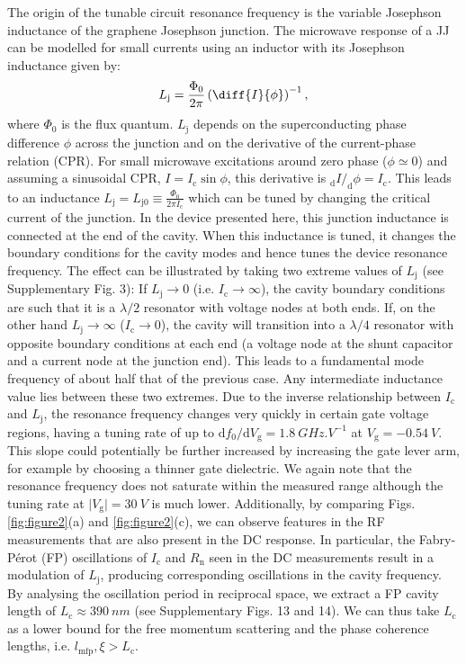 The origin of the tunable circuit resonance frequency is the variable Josephson inductance of the graphene Josephson junction.
The microwave response of a JJ can be modelled for small currents using an inductor with its Josephson inductance given by:
\begin{equation}
L_\text{j} = \frac{\Phi_0}{2\pi} \left(\diff{I}{\phi}\right)^{-1}, \label{eq:Lj}
\end{equation}
where $\Phi_0$ is the flux quantum.
$L_\text{j}$ depends on the superconducting phase difference $\phi$ across the junction and on the derivative of the current-phase relation (CPR).
For small microwave excitations around zero phase ($\phi\simeq 0$) and assuming a sinusoidal CPR, $I=I_\text{c}\sin\phi$, this derivative is $_\text{d}I/_\text{d}\phi = I_\text{c}$.
This leads to an inductance $L_\text{j} = L_{\text{j}0} \equiv \frac{\Phi_0}{2\pi I_\text{c}}$ which can be tuned by changing the critical current of the junction.
In the device presented here, this junction inductance is connected at the end of the cavity.
When this inductance is tuned, it changes the boundary conditions for the cavity modes and hence tunes the device resonance frequency.
The effect can be illustrated by taking two extreme values of $L_\text{j}$ (see Supplementary Fig. 3):
If $L_\text{j}\rightarrow 0$ (i.e. $I_\text{c}\rightarrow\infty$), the cavity boundary conditions are such that it is a $\lambda/2$ resonator with voltage nodes at both ends.
If, on the other hand $L_\text{j}\rightarrow \infty$ ($I_\text{c}\rightarrow 0$), the cavity will transition into a $\lambda/4$ resonator with opposite boundary conditions at each end (a voltage node at the shunt capacitor and a current node at the junction end).
This leads to a fundamental mode frequency of about half that of the previous case.
Any intermediate inductance value lies between these two extremes.
Due to the inverse relationship between $I_\text{c}$ and $L_\text{j}$, the resonance frequency changes very quickly in certain gate voltage regions, having a tuning rate of up to $\mathrm{d}f_0/\mathrm{d}V_\text{g}=\SI{1.8}{GHz.V^{-1}}$ at $V_\text{g}=\SI{-0.54}{V}$.
This slope could potentially be further increased by increasing the gate lever arm, for example by choosing a thinner gate dielectric.
We again note that the resonance frequency does not saturate within the measured range although the tuning rate at $\vert V_\text{g} \rvert=\SI{30}{V}$ is much lower.
Additionally, by comparing Figs. \ref{fig:figure2}(a) and \ref{fig:figure2}(c), we can observe features in the RF measurements that are also present in the DC response.
In particular, the Fabry-P\'erot (FP) oscillations of $I_\text{c}$ and $R_\text{n}$ seen in the DC measurements result in a modulation of $L_\text{j}$, producing corresponding oscillations in the cavity frequency.
By analysing the oscillation period in reciprocal space, we extract a FP cavity length of $L_\text{c}\approx \SI{390}{nm}$ (see Supplementary Figs. 13 and 14).
We can thus take $L_\text{c}$ as a lower bound for the free momentum scattering and the phase coherence lengths, i.e. $l_\text{mfp},\xi>L_\text{c}$.

